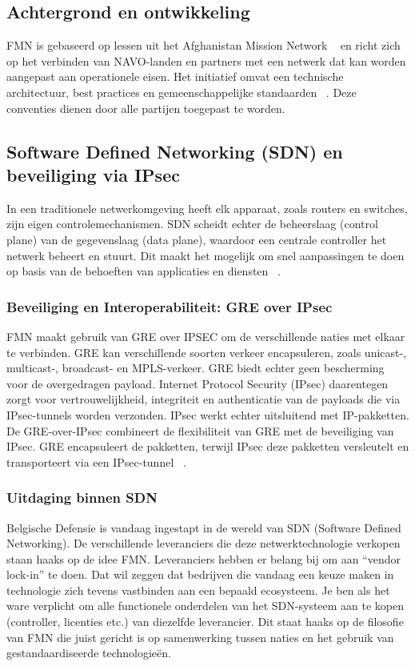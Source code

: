 \subsection{Achtergrond en ontwikkeling}
FMN is gebaseerd op lessen uit het Afghanistan Mission Network ~\autocite{FMN} en richt zich op het verbinden van NAVO-landen en partners met een netwerk dat kan worden aangepast aan operationele eisen. Het initiatief omvat een technische architectuur, best practices en gemeenschappelijke standaarden ~\autocite{FMN_Guide}. Deze conventies dienen door alle partijen toegepast te worden.

\subsection{Software Defined Networking (SDN) en beveiliging via IPsec}
In een traditionele netwerkomgeving heeft elk apparaat, zoals routers en switches, zijn eigen controlemechanismen. SDN scheidt echter de beheerslaag (control plane) van de gegevenslaag (data plane), waardoor een centrale controller het netwerk beheert en stuurt. Dit maakt het mogelijk om snel aanpassingen te doen op basis van de behoeften van applicaties en diensten ~\autocite{SDN}.

\subsubsection{Beveiliging en Interoperabiliteit: GRE over IPsec}
FMN maakt gebruik van GRE over IPSEC om de verschillende naties met elkaar te verbinden.
GRE kan verschillende soorten verkeer encapsuleren, zoals unicast-, multicast-, broadcast- en MPLS-verkeer. GRE biedt echter geen bescherming voor de overgedragen payload.
Internet Protocol Security (IPsec) daarentegen zorgt voor vertrouwelijkheid, integriteit en authenticatie van de payloads die via IPsec-tunnels worden verzonden. IPsec werkt echter uitsluitend met IP-pakketten.
De GRE-over-IPsec combineert de flexibiliteit van GRE met de beveiliging van IPsec. GRE encapsuleert de pakketten, terwijl IPsec deze pakketten versleutelt en transporteert via een IPsec-tunnel ~\autocite{GRE}.

\subsubsection{Uitdaging binnen SDN}
Belgische Defensie is vandaag ingestapt in de wereld van SDN (Software Defined Networking). De verschillende leveranciers die deze netwerktechnologie verkopen staan haaks op de idee FMN. Leveranciers hebben er belang bij om aan “vendor lock-in” te doen. Dat wil zeggen dat bedrijven die vandaag een keuze maken in technologie zich tevens vastbinden aan een bepaald ecosysteem. Je ben als het ware verplicht om alle functionele onderdelen van het SDN-systeem aan te kopen (controller, licenties etc.) van diezelfde leverancier. Dit staat haaks op de filosofie van FMN die juist gericht is op samenwerking tussen naties en het gebruik van gestandaardiseerde technologieën.

